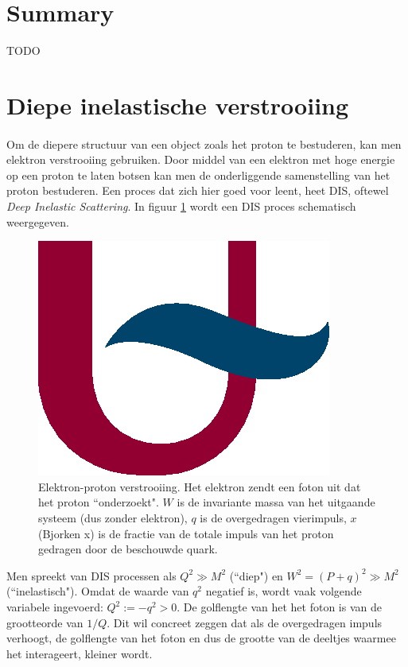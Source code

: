 \documentclass[a4paper,11pt]{article}
\numberwithin{equation}{section} %
\begin{document}
\section*{Summary}
TODO
\thispagestyle{empty}
\newpage

\tableofcontents
\thispagestyle{empty}
\newpage

\section{Diepe inelastische verstrooiing}
      \paragraph{}
Om de diepere structuur van een object zoals het proton te bestuderen, kan men elektron verstrooiing gebruiken.
Door middel van een elektron met hoge energie op een proton te laten botsen kan men de onderliggende samenstelling van het proton bestuderen.
Een proces dat zich hier goed voor leent, heet DIS, oftewel \textit{Deep Inelastic Scattering}. In figuur \ref{fig:DIS} wordt een DIS proces schematisch weergegeven.
\begin{figure} [H]
  \begin{center}
    \includegraphics[width=.5\textwidth]{Afbeeldingen/placeholder.eps}
    \caption{Elektron-proton verstrooiing. Het elektron zendt een foton uit dat het proton ``onderzoekt".
$W$ is de invariante massa van het uitgaande systeem (dus zonder elektron), $q$ is de overgedragen vierimpuls, $x$ (Bjorken x) is de fractie van de totale impuls van het proton gedragen door de beschouwde quark.}
   \label{fig:DIS}
  \end{center}
\end{figure}
 Men spreekt van DIS processen als $Q^2 \gg M^2$ (``diep") en $W^2 = (P+q)^2 \gg M^2$ (``inelastisch").
Omdat de waarde van $q^2$ negatief is, wordt vaak volgende variabele ingevoerd: $Q^2 :=-q^2 > 0$. De golflengte van het het foton is van de grootteorde van $1/Q$.
Dit wil concreet zeggen dat als de overgedragen impuls verhoogt, de golflengte van het foton en dus de grootte van de deeltjes waarmee het interageert, kleiner wordt.
\end{document}
